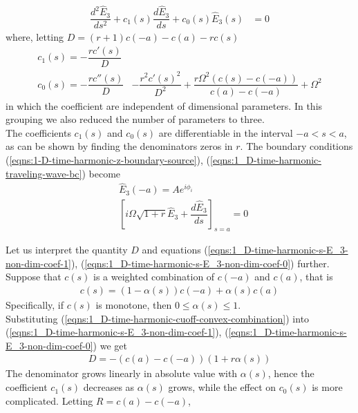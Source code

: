 \documentclass[12pt,twoside]{report}
\begin{document}
\begin{align}
\label{eqns:1_D-time-harmonic-s-E_3-non-dim}
\dfrac{d^2\hat{E}_3}{ds^2}+c_1(s)\dfrac{d\hat{E}_3}{ds}+ c_0(s)\hat{E}_3(s) &=0 
\end{align}
where, letting $D = (r+1) c(-a)-c(a)-r c(s)$
\begin{subequations}
\begin{align}
\label{eqns:1_D-time-harmonic-s-E_3-non-dim-coef-1}
c_1(s) = -\dfrac{r c'(s) }{D}& \\
\label{eqns:1_D-time-harmonic-s-E_3-non-dim-coef-0}
c_0(s) = -\dfrac{r c''(s)}{D}&-\dfrac{r^2 c'(s)^2}{D^2} 
   +\dfrac{r \Omega ^2
   (c(s)-c(-a))}{c(a)-c(-a)}+\Omega ^2 
\end{align}
\end{subequations}
in which the coefficient are independent of dimensional parameters. In this grouping we also reduced the number of parameters to three.\\ 
The coefficients $c_1(s)$ and $c_0(s)$ are differentiable in the interval $-a<s<a$, as can be shown by finding the denominators zeros in $r$.
The boundary conditions (\ref{eqns:1-D-time-harmonic-z-boundary-source}),
 (\ref{eqns:1_D-time-harmonic-traveling-wave-bc}) become
\begin{subequations}
\begin{align}
\label{eqns:1-D-time-harmonic-z-boundary-source-normalized}
&\hat{E}_3(-a) = Ae^{i \phi_i} \\
\label{eqns:1_D-time-harmonic-traveling-wave-bc-normalized}
&\left[ i \Omega \sqrt{1+r} \hat{E}_3 +  \dfrac{d \hat{E}_3}{d s} \right]_{s = a}=0
\end{align}
\end{subequations}


Let us interpret the quantity $D$ and equations (\ref{eqns:1_D-time-harmonic-s-E_3-non-dim-coef-1}), (\ref{eqns:1_D-time-harmonic-s-E_3-non-dim-coef-0}) further. Suppose that $c(s)$ is a weighted combination of $c(-a)$ and $c(a)$, that is
\begin{align}
c(s) = (1-\alpha(s))c(-a) + \alpha(s) c(a) 
\end{align}
\label{eqns:1_D-time-harmonic-cuoff-convex-combination}
Specifically, if $c(s)$ is monotone, then $0 \leq \alpha(s) \leq 1$. \\
Substituting (\ref{eqns:1_D-time-harmonic-cuoff-convex-combination}) into (\ref{eqns:1_D-time-harmonic-s-E_3-non-dim-coef-1}), (\ref{eqns:1_D-time-harmonic-s-E_3-non-dim-coef-0}) we get
\begin{align*}
D = -(c(a)-c(-a)) (1+r \alpha (s))
\end{align*}
The denominator grows linearly in absolute value with $\alpha(s)$, hence the coefficient $c_1(s)$ decreases as $\alpha(s)$ grows, while the effect on $c_0(s)$ is more complicated. Letting $R = c(a)-c(-a)$, 
\end{document}
